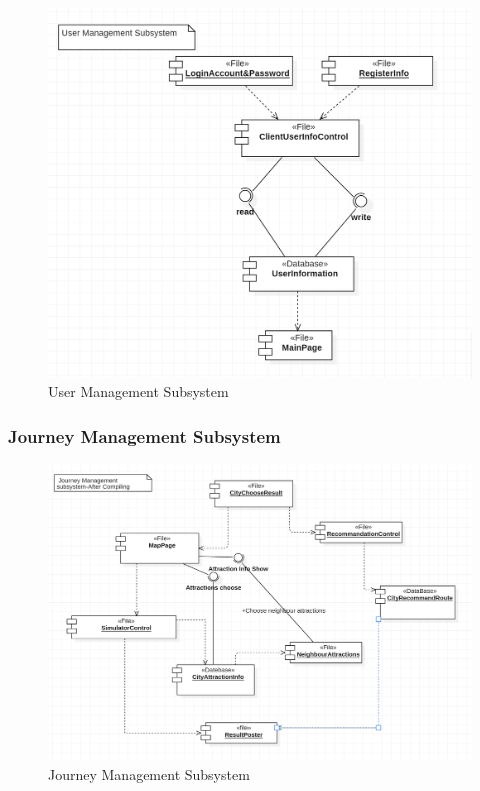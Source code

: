 \documentclass[10pt]{article}
\begin{document}
\begin{figure}[H]
    \centering
    
    \includegraphics[width=14cm]{userafter.png}
    \caption{User Management Subsystem}
    \label{User Management Subsystem 2}
\end{figure}

\subsubsection{Journey Management Subsystem}
\begin{figure}[H]
    \centering
    
    \includegraphics[width=14cm]{journeyafter.png}
    \caption{Journey Management Subsystem}
    \label{Journey Management Subsystem 2}
\end{figure}
\end{document}
